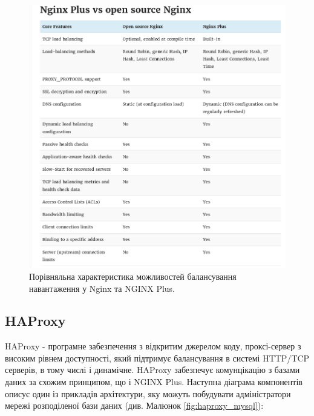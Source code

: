 \documentclass[14pt]{vakthesis}
\begin{document}
\begin{figure}
\centering
\includegraphics[width=\linewidth]{images/compare_nginx_nginx_plus.png}
     \caption{Порівняльна характеристика можливостей балансування навантаження у Nginx та NGINX Plus.}
     \label{fig:nginx_nginx_plus}
\end{figure}

\subsection{HAProxy}

HAProxy - програмне забезпечення з відкритим джерелом коду, проксі-сервер з високим рівнем доступності, який підтримує балансування в системі HTTP/TCP серверів, в тому числі і динамічне.
HAProxy забезпечує комунцікацію з базами даних за схожим принципом, що і NGINX Plus. Наступна діаграма компонентів описує один із прикладів архітектури, яку можуть побудувати адміністратори мережі розподіленої бази даних (див. Малюнок \ref{fig:haproxy_mysql}):
\end{document}
